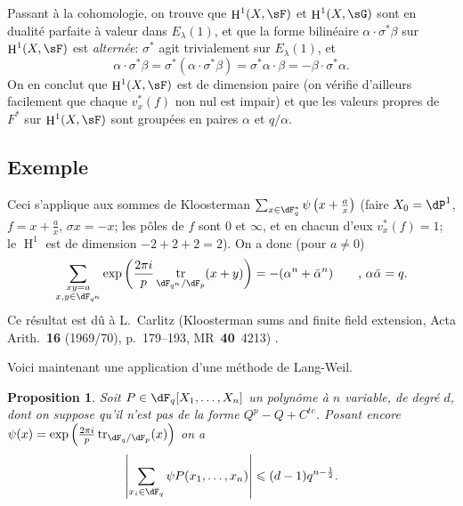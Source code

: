 \documentclass[oneside]{book}
\DeclareMathOperator{\h}{H}
\DeclareMathOperator{\tr}{tr}
\theoremstyle{sga-source}
\theoremstyle{sga-source-dash}
\theoremstyle{sga-source-dotdash}
\theoremstyle{sga-source-number-note-dash}
\theoremstyle{sga-source-note-number-dotdash}
\theoremstyle{sga-source-example-dotdash}
\theoremstyle{sga-source-inline-number}
\theoremstyle{sga-source-bare-number}
\theoremstyle{sga-source}
\newtheorem{proposition_}[subsection]{Proposition}
\newcommand{\PrintPage}[1]{}\newcommand{\MathPage}[1]{}\newcommand{\PrintCite}[2]{#1}\newcommand{\var}[3]{#1}
\begin{document}
Passant à la cohomologie, on trouve que $\h^1(X,\sF)$ et $\h^1(X,\sG)$ sont en 
\var{dualité parfaite à valeur dans $E_\lambda(1)$}{dualité parfaite à valeur dans $E_\lambda(-1)$}{S45-SOL-0780}, et que la forme bilinéaire 
$\alpha\cdot \sigma^\ast\beta$ sur $\h^1(X,\sF)$ est \emph{alternée}: 
\var{$\sigma^\ast$ agit trivialement sur $E_\lambda(1)$}{$\sigma^\ast$ agit trivialement sur $E_\lambda(-1)$}{S45-SOL-0781}, et 
\[
  \alpha\cdot \sigma^\ast \beta = \sigma^\ast(\alpha\cdot \sigma^\ast \beta) = \sigma^\ast \alpha\cdot \beta = -\beta\cdot \sigma^\ast \alpha \text{.} 
\]
On en conclut que $\h^1(X,\sF)$ est de dimension paire (on vérifie d'ailleurs 
facilement que chaque $v_x^\ast(f)$ non nul est impair) et que les valeurs 
propres de $F^\ast$ sur $\h^1(X,\sF)$ sont groupées en paires $\alpha$ et 
$q/\alpha$. 





\PrintPage{193}
\subsection{Exemple}\label{VI:3-7}

Ceci s'applique aux sommes de Kloosterman 
$\sum_{x\in \dF_q^\ast} \psi\left(x+\frac a x\right)$ (faire 
$X_0=\dP^1$, $f=x+\frac a x$, $\sigma x=-x$; les pôles de $f$ sont $0$ et 
$\infty$, et en chacun d'eux $v_x^\ast(f)=1$; le $\h^1$ est de dimension 
$-2+2+2=2$). On a donc (pour $a\ne 0$) 
\[
  \sum_{\substack{x y=a \\ x,y\in \dF_{q^n}}} \exp\left(\frac{2\pi i}{p} \tr_{\dF_{q^n}/\dF_p}(x+y)\right) = -(\alpha^n+\bar\alpha^n) \qquad \text{, }\alpha\bar \alpha = q \text{.} 
\]
Ce résultat est dû à L.\ Carlitz (Kloosterman sums and finite field extension, Acta Arith.~\textbf{16} (1969/70), p.~179--193, MR~\textbf{40}~4213) \cite{ca69}. 

Voici maintenant une application d'une méthode de Lang-Weil. 





\begin{proposition_}\label{VI:3-8}
Soit $P\in \dF_q[X_1,\dots,X_n]$ un polynôme \var{à $n$ variable}{à $n$ variables}{S45-SOL-0784}, de degré 
$d$, dont on suppose qu'il n'est pas de la forme $Q^p-Q+C^{te}$. Posant encore 
$\psi(x) = \exp\left(\frac{2\pi i}{p} \tr_{\dF_q/\dF_p}(x)\right)$ on a 
\[
  \left|\sum_{x_i\in \dF_q} \psi P(x_1,\dots,x_n)\right| \leqslant (d-1) q^{n-\frac 1 2} \text{.}
\]
\end{proposition_}
\end{document}
